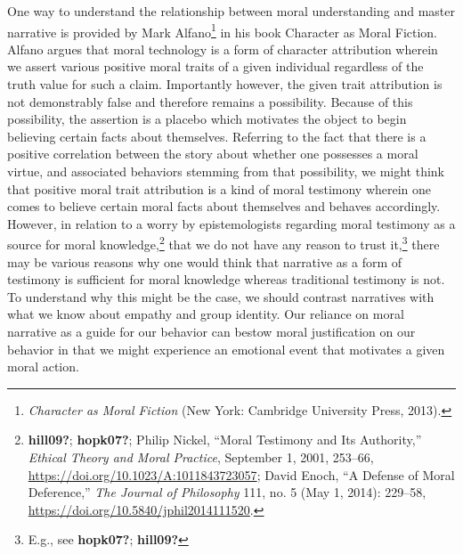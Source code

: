 \documentclass[phdthesis,12pt,final]{wuthesis}
\theoremstyle{definition}
\theoremstyle{definition}
\theoremstyle{definition}
\theoremstyle{definition}
\theoremstyle{remark}
\begin{document}
One way to understand the relationship between moral understanding and master narrative is provided by Mark Alfano\footnote{\emph{Character as Moral Fiction} (New York: Cambridge University Press, 2013).} in his book Character as Moral Fiction. Alfano argues that moral technology is a form of character attribution wherein we assert various positive moral traits of a given individual regardless of the truth value for such a claim. Importantly however, the given trait attribution is not demonstrably false and therefore remains a possibility. Because of this possibility, the assertion is a placebo which motivates the object to begin believing certain facts about themselves. Referring to the fact that there is a positive correlation between the story about whether one possesses a moral virtue, and associated behaviors stemming from that possibility, we might think that positive moral trait attribution is a kind of moral testimony wherein one comes to believe certain moral facts about themselves and behaves accordingly. However, in relation to a worry by epistemologists regarding moral testimony as a source for moral knowledge,\footnote{\textbf{hill09?}; \textbf{hopk07?}; Philip Nickel, {``Moral {Testimony} and Its {Authority},''} \emph{Ethical Theory and Moral Practice}, September 1, 2001, 253--66, \url{https://doi.org/10.1023/A:1011843723057}; David Enoch, {``A {Defense} of {Moral Deference},''} \emph{The Journal of Philosophy} 111, no. 5 (May 1, 2014): 229--58, \url{https://doi.org/10.5840/jphil2014111520}.} that we do not have any reason to trust it,\footnote{E.g., see \textbf{hopk07?}; \textbf{hill09?}} there may be various reasons why one would think that narrative as a form of testimony is sufficient for moral knowledge whereas traditional testimony is not. To understand why this might be the case, we should contrast narratives with what we know about empathy and group identity. Our reliance on moral narrative as a guide for our behavior can bestow moral justification on our behavior in that we might experience an emotional event that motivates a given moral action.
\end{document}
